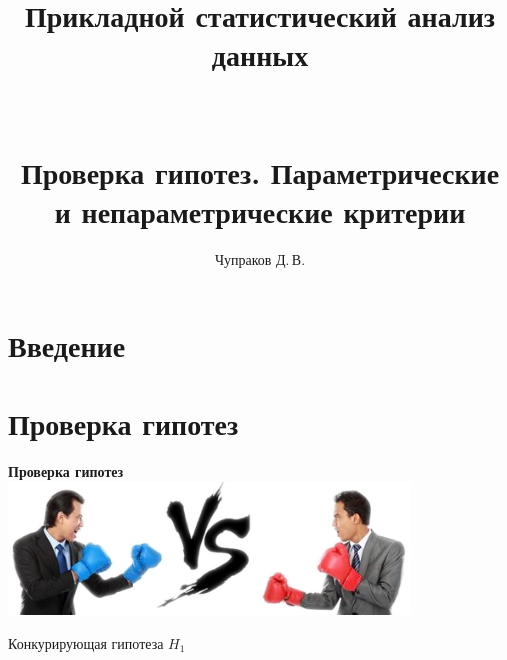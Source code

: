 \documentclass[11pt,pdf,utf8,hyperref={unicode},aspectratio=169]{beamer}
\title{Прикладной статистический анализ данных\\~\\~\\\large{ Проверка гипотез. Параметрические и непараметрические критерии}}
\author{Чупраков Д.\,В.}
\date{}
\begin{document}
\begin{frame}
    \titlepage
\end{frame}

\section{Введение}



\section{Проверка гипотез}
\begin{frame}
\centering
\textbf{Проверка гипотез}
\includegraphics[width=0.8\textwidth]{vs.png}
\begin{multicols}{2}
    \centering

    \columnbreak

    \alert{Конкурирующая гипотеза $H_1$}
\end{multicols}
\end{frame}
\end{document}
